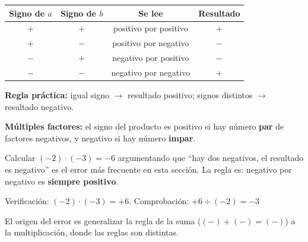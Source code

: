 \documentclass[11pt, letterpaper]{article}
\begin{document}
\begin{tcolorbox}[importantbox, title={Regla de los signos --- multiplicaci\'on}]
\begin{center}
\renewcommand{\arraystretch}{1.4}
\begin{tabular}{ccc|c}
\toprule
\textbf{Signo de }$a$ & \textbf{Signo de }$b$ & \textbf{Se lee} & \textbf{Resultado}\\
\midrule
$+$ & $+$ & positivo por positivo & $+$\\
$+$ & $-$ & positivo por negativo & $-$\\
$-$ & $+$ & negativo por positivo & $-$\\
$-$ & $-$ & negativo por negativo & $+$\\
\bottomrule
\end{tabular}
\end{center}
\medskip
\textbf{Regla pr\'actica:} igual signo $\to$ resultado positivo; signos distintos $\to$ resultado negativo.

\textbf{M\'ultiples factores:} el signo del producto es positivo si hay n\'umero \textbf{par} de factores negativos, y negativo si hay n\'umero \textbf{impar}.
\end{tcolorbox}

\begin{tcolorbox}[warningbox, title={Error frecuente --- el signo del producto de dos negativos}]
Calcular $(-2)\cdot(-3)=-6$ argumentando que ``hay dos negativos, el resultado es negativo'' es el error m\'as frecuente en esta secci\'on. La regla es: negativo por negativo es \textbf{siempre positivo}.

Verificaci\'on: $(-2)\cdot(-3)=+6$. Comprobaci\'on: $+6\div(-2)=-3$ \checkmark

El origen del error es generalizar la regla de la suma ($(-)+(-) = (-)$) a la multiplicaci\'on, donde las reglas son distintas.
\end{tcolorbox}
\end{document}
